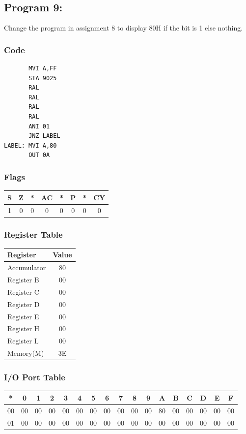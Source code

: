 \documentclass[]{report}
\begin{document}
\vspace{10mm}
\subsection*{Program 9: }
Change the program in assignment 8 to display 80H if the bit is 1 else nothing.
\subsubsection{Code}
\begin{verbatim}
	   MVI A,FF
	   STA 9025
	   RAL
	   RAL
	   RAL
	   RAL
	   ANI 01
	   JNZ LABEL
LABEL: MVI A,80
	   OUT 0A
\end{verbatim}
\subsubsection{Flags}
\begin{tabular}{cccccccc}
\hline
    S & Z & *  & AC & *  & P & *  & CY  \\
    \hline
    1&0&0&0&0&0&0&0 \\
    \hline
\end{tabular}
\subsubsection {Register Table}
\begin{tabular}{lc}
    \hline
    Register & Value\\
    \hline
    Accumulator     & 80        \\
    Register B      &  00        \\
    Register C      &  00        \\
    Register D      &   00       \\
    Register E      &   00       \\
    Register H      &  00        \\
    Register L      &  00         \\
    Memory(M)       &      3E         \\
    \hline

\end{tabular}
\subsubsection {I/O Port Table}
\begin{tabular}{ccccccccccccccccc}
    \hline
    * & 0 & 1 & 2 & 3 & 4 & 5 & 6 & 7 & 8 & 9 & A & B & C & D & E & F  \\
        \hline

    00 & 00 & 00 & 00 & 00 & 00 & 00 & 00 & 00 & 00 & 00 & 80 & 00 & 00 & 00 & 00 & 00 \\
    01 & 00 & 00 & 00 & 00 & 00 & 00 & 00 & 00 & 00 & 00 & 00 & 00 & 00 & 00 & 00 & 00 \\

    \hline
\end{tabular}
\end{document}

